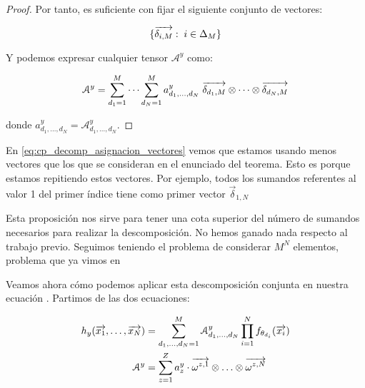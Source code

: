 \begin{proof}
    Por tanto, es suficiente con fijar el siguiente conjunto de vectores:

    \begin{equation}
        \{ \overrightarrow{\delta_{i, M}}: \; i \in \Delta_{M} \}
    \end{equation}

    Y podemos expresar cualquier tensor $\mathcal{A}^y$ como:

    \begin{equation}
        \mathcal{A}^y = \sum_{d_1 = 1}^{M} \cdots \sum_{d_N = 1}^{M} a^y_{d_1, \ldots, d_N} \; \overrightarrow{\delta_{d_1, M}} \otimes \cdots \otimes \overrightarrow{\delta_{d_N, M}}
    \end{equation}

    donde $a^y_{d_1, \ldots, d_N} = \mathcal{A}^y_{d_1, \ldots, d_N}$.

\end{proof}

\begin{observacion}
	En \eqref{eq:cp_decomp_asignacion_vectores} vemos que estamos usando menos vectores que los que se consideran en el enunciado del teorema. Esto es porque estamos repitiendo estos vectores. Por ejemplo, todos los sumandos referentes al valor 1 del primer índice tiene como primer vector $\vec{\delta}_{1, N}$
\end{observacion}

\begin{observacion}
	Esta proposición nos sirve para tener una cota superior del número de sumandos necesarios para realizar la descomposición. No hemos ganado nada respecto al trabajo previo. Seguimos teniendo el problema de considerar $M^N$ elementos, problema que ya vimos en 
\end{observacion}

Veamos ahora cómo podemos aplicar esta descomposición conjunta en nuestra ecuación . Partimos de las dos ecuaciones:

\begin{equation}
	\begin{split}
		h_y(\overrightarrow{x_1}, \ldots, \overrightarrow{x_N}) &= \sum_{d_1, \ldots, d_N = 1}^{M} \mathcal{A}^y_{d_1, \ldots, d_N} \prod_{i = 1}^N f_{\theta_{d_i}}(\overrightarrow{x_i}) \\
		\mathcal{A}^y &= \sum_{z = 1}^Z a_z^y \cdot \overrightarrow{\omega^{z, 1}} \otimes \ldots \otimes \overrightarrow{\omega^{z, N}} \\
	\end{split}
\end{equation}


